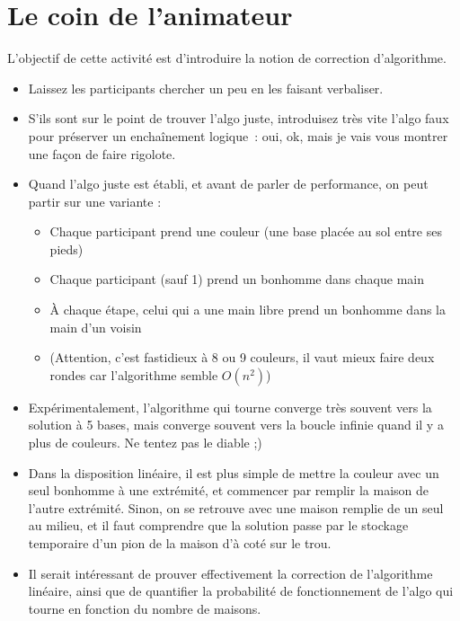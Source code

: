 

\section*{Le coin de l'animateur}

L'objectif de cette activité est d'introduire la notion de correction
d'algorithme.

\begin{itemize}
\item Laissez les participants chercher un peu en les faisant verbaliser.
\item S'ils sont sur le point de trouver l'algo juste, introduisez très vite
  l'algo faux pour préserver un enchaînement logique~: \og oui, ok, mais je vais
  vous montrer une façon de faire rigolote. \fg
\item Quand l'algo juste est établi, et avant de parler de performance, on peut
  partir sur une variante :
  \begin{itemize}
  \item Chaque participant prend une couleur (une base placée au sol entre ses
    pieds)
  \item Chaque participant (sauf 1) prend un bonhomme dans chaque main
  \item À chaque étape, celui qui a une main libre prend un bonhomme dans la
    main d'un voisin
  \item (Attention, c'est fastidieux à 8 ou 9 couleurs, il vaut mieux faire deux
    rondes car l'algorithme semble $O(n^2)$)
  \end{itemize}
\item Expérimentalement, l'algorithme qui tourne converge très souvent vers la
  solution à 5 bases, mais converge souvent vers la boucle infinie quand il y a
  plus de couleurs. Ne tentez pas le diable ;)
\item Dans la disposition linéaire, il est plus simple de mettre la couleur avec
  un seul bonhomme à une extrémité, et commencer par remplir la maison de
  l'autre extrémité. Sinon, on se retrouve avec une maison remplie de un seul au
  milieu, et il faut comprendre que la solution passe par le stockage temporaire
  d'un pion de la maison d'à coté sur le trou.
\item Il serait intéressant de prouver effectivement la correction de
  l'algorithme linéaire, ainsi que de quantifier la probabilité de
  fonctionnement de l'algo qui tourne en fonction du nombre de maisons.
\end{itemize}


